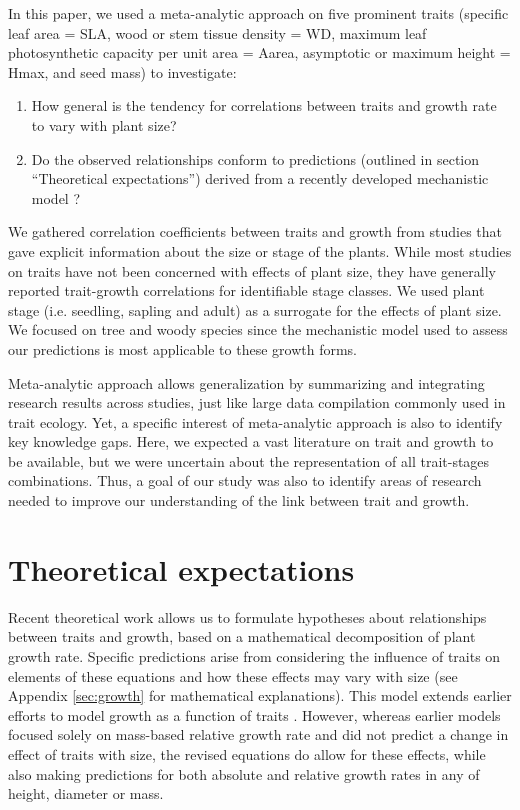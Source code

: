 \documentclass[a4paper,11pt]{article}
\begin{document}
In this paper, we used a meta-analytic approach on five prominent traits (specific leaf area = SLA, wood or stem tissue density = WD, maximum leaf photosynthetic capacity per unit area = Aarea, asymptotic or maximum height = Hmax, and seed mass) to investigate:
\begin{enumerate}
  \item How general is the tendency for correlations between traits and growth rate to vary with plant size?
  \item  Do the observed relationships conform to predictions (outlined in section ``Theoretical expectations'') derived from a recently developed mechanistic model \citep{Falster:2011ii}?
\end{enumerate}
We gathered correlation coefficients between traits and growth from studies that gave explicit information about the size or stage of the plants. While most studies on traits have not been concerned with effects of plant size, they have generally reported trait-growth correlations for identifiable stage classes. We used plant stage (i.e. seedling, sapling and adult) as a surrogate for the effects of plant size. We focused on tree and woody species since the mechanistic model used to assess our predictions is most applicable to these growth forms. 

Meta-analytic approach allows generalization by summarizing and integrating research results across studies, just like large data compilation commonly used in trait ecology. Yet, a specific interest of meta-analytic approach is also to identify key knowledge gaps. Here, we expected a vast literature on trait and growth to be available, but we were uncertain about the representation of all trait-stages combinations. Thus, a goal of our study was also to identify areas of research needed to improve our understanding of the link between trait and growth.

\section*{Theoretical expectations}\label{theory}

Recent theoretical work \citep{Falster:2011ii} allows us to formulate hypotheses about relationships between traits and growth, based on a mathematical decomposition of plant growth rate. Specific predictions arise from considering the influence of traits on elements of these equations and how these effects may vary with size (see Appendix \ref{sec:growth} for mathematical explanations). This model extends earlier efforts to model growth as a function of traits \citep{Lambers:1992bj,cornelissen_seedling_1996,Wright:2000kw,Enquist:2007ek}. However, whereas earlier models focused solely on mass-based relative growth rate and did not predict a change in effect of traits with size, the revised equations do allow for these effects, while also making predictions for both absolute and relative growth rates in any of height, diameter or mass.
\end{document}
